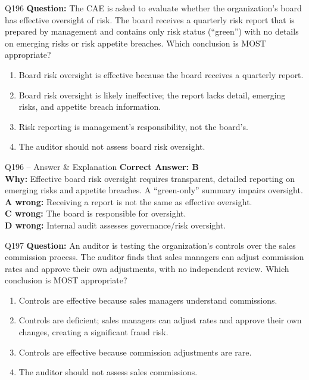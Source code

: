 \documentclass[aspectratio=169,10pt]{beamer}
\begin{document}
	\begin{frame}[t]{Q196}
		\small
		\textbf{Question:} The CAE is asked to evaluate whether the organization's board has effective oversight of risk. The board receives a quarterly risk report that is prepared by management and contains only risk status (``green'') with no details on emerging risks or risk appetite breaches. Which conclusion is MOST appropriate?
		\begin{enumerate}[label=\Alph*.,itemsep=1pt,topsep=2pt]
			\item Board risk oversight is effective because the board receives a quarterly report.
			\item Board risk oversight is likely ineffective; the report lacks detail, emerging risks, and appetite breach information.
			\item Risk reporting is management's responsibility, not the board's.
			\item The auditor should not assess board risk oversight.
		\end{enumerate}
	\end{frame}
	
	\begin{frame}[t]{Q196 -- Answer \& Explanation}
		\small
		\textbf{Correct Answer: B} \\[4pt]
		\textbf{Why:} Effective board risk oversight requires transparent, detailed reporting on emerging risks and appetite breaches. A ``green-only'' summary impairs oversight. \\[4pt]
		\textbf{A wrong:} Receiving a report is not the same as effective oversight. \\[2pt]
		\textbf{C wrong:} The board is responsible for oversight. \\[2pt]
		\textbf{D wrong:} Internal audit assesses governance/risk oversight.
	\end{frame}
	
	\begin{frame}[t]{Q197}
		\small
		\textbf{Question:} An auditor is testing the organization's controls over the sales commission process. The auditor finds that sales managers can adjust commission rates and approve their own adjustments, with no independent review. Which conclusion is MOST appropriate?
		\begin{enumerate}[label=\Alph*.,itemsep=1pt,topsep=2pt]
			\item Controls are effective because sales managers understand commissions.
			\item Controls are deficient; sales managers can adjust rates and approve their own changes, creating a significant fraud risk.
			\item Controls are effective because commission adjustments are rare.
			\item The auditor should not assess sales commissions.
		\end{enumerate}
	\end{frame}
	
\end{document}

